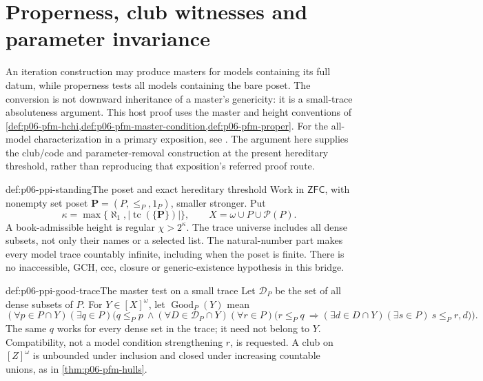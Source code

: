 \section{Properness, club witnesses and parameter invariance}
\label{sec:p06-properness-parameter-invariance}

An iteration construction may produce masters for models containing its
full datum, while properness tests all models containing the bare poset.
The conversion is not downward inheritance of a master's genericity:
it is a small-trace absoluteness argument. This host proof uses the
master and height conventions of
\cref{def:p06-pfm-hchi,def:p06-pfm-master-condition,def:p06-pfm-proper}.
For the all-model characterization in a primary exposition, see
\cite[pp.~48--49]{Dow1988ElementarySubmodels}. The argument here supplies
the club/code and parameter-removal construction at the present hereditary
threshold, rather than reproducing that exposition's referred proof route.

\begin{hbconvention}{def:p06-ppi-standing}{The poset and exact hereditary threshold}
Work in \(\mathsf{ZFC}\), with nonempty set poset
\(\mathbf P=(P,\leq_P,1_P)\), smaller stronger. Put
\[
 \kappa=\max\{\aleph_1,|\operatorname{tc}(\{\mathbf P\})|\},
 \qquad X=\omega\cup P\cup\mathcal P(P).
\]
A book-admissible height is regular \(\chi>2^\kappa\).
The trace universe includes all dense subsets, not only their names or a
selected list. The natural-number part makes every model trace countably
infinite, including when the poset is finite. There is no inaccessible,
GCH, ccc, closure or generic-existence hypothesis in this bridge.
\end{hbconvention}

\begin{hbdefinition}{def:p06-ppi-good-trace}{The master test on a small trace}
Let \(\mathcal D_P\) be the set of all dense subsets of \(P\).
For \(Y\in[X]^\omega\), let \(\operatorname{Good}_P(Y)\) mean
\[
 (\forall p\in P\cap Y)(\exists q\in P)\bigl(q\leq_P p\ \land
  (\forall D\in\mathcal D_P\cap Y)(\forall r\in P)
   \bigl(r\leq_P q\ \Longrightarrow
    (\exists d\in D\cap Y)(\exists s\in P)\ s\leq_P r,d\bigr)\bigr).
\]
The same \(q\) works for every dense set in the trace; it need not
belong to \(Y\). Compatibility, not a model condition strengthening
\(r\), is requested. A club on \([Z]^\omega\) is unbounded under
inclusion and closed under increasing countable unions, as in
\cref{thm:p06-pfm-hulls}.
\end{hbdefinition}


